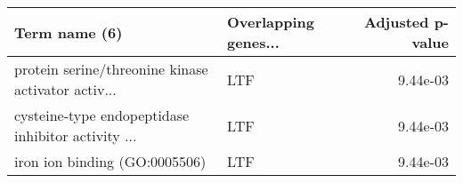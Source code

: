 \begin{tabular}{llr}
\toprule
                                     Term name (6) & Overlapping genes... &  Adjusted p-value \\
\midrule
protein serine/threonine kinase activator activ... &                  LTF &          9.44e-03 \\
cysteine-type endopeptidase inhibitor activity ... &                  LTF &          9.44e-03 \\
                     iron ion binding (GO:0005506) &                  LTF &          9.44e-03 \\
\bottomrule
\end{tabular}
